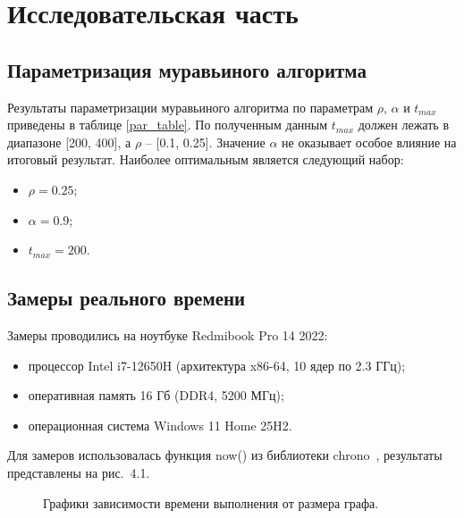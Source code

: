 \chapter{Исследовательская часть}

\section{Параметризация муравьиного алгоритма}


Результаты параметризации муравьиного алгоритма по параметрам $\rho$, $\alpha$ и $t_{max}$ приведены в таблице \ref{par_table}.
По полученным данным $t_{max}$ должен лежать в диапазоне [200, 400], а $\rho$ -- [0.1, 0.25]. Значение $\alpha$ не оказывает особое влияние на итоговый результат.
Наиболее оптимальным является следующий набор:
\begin{itemize}
	\item $\rho = 0.25$;
	\item $\alpha = 0.9$;
	\item $t_{max} = 200$.
\end{itemize}


\section{Замеры реального времени}

Замеры проводились на ноутбуке Redmibook Pro 14 2022:
\begin{itemize}
	\item процессор Intel i7-12650H (архитектура x86-64, 10 ядер по 2.3 ГГц);
	\item оперативная память 16 Гб (DDR4, 5200 МГц);
	\item операционная система Windows 11 Home 25H2.
\end{itemize}
Для замеров использовалась функция now() из библиотеки chrono~\cite[с.~705]{lit1}, результаты представлены на рис.~4.1.

\begin{figure}[!htbp]
	\centering
	\caption{Графики зависимости времени выполнения от размера графа.}
\end{figure}

